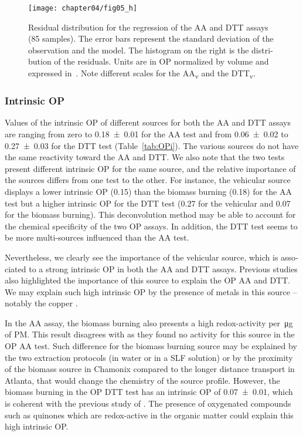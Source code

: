 \begin{otherlanguage}{english}
\begin{figure}[ht]
    \centering
    \texttt{[image: chapter04/fig05\_h]}
    \caption{Residual distribution for the regression of the AA and DTT assays
        (85 samples). The error bars represent the standard deviation of the
        observation and the model. The histogram on the right is the
        distribution of the residuals. Units are in OP normalized by volume and
        expressed in~\si{\opv}. Note different scales for the
    AA\textsubscript{v} and the DTT\textsubscript{v}.}
    \label{fig:residual}
\end{figure}

\subsubsection{Intrinsic OP}\label{intrinsic-op}

Values of the intrinsic OP of different sources for both the AA and DTT assays are ranging
from zero to \SI{0.18(1)}{\opm} for the AA test and from \SI{0.06(2)}{\opm} to
\SI{0.27(3)}{\opm} for the DTT test (Table~\ref{tab:OPi}). The various sources do not
have the same reactivity toward the AA and DTT. We also note that the two tests present
different intrinsic OP for the same source, and the relative importance of the sources
differs from one test to the other. For instance, the vehicular source displays a lower
intrinsic OP (\SI{0.15}{\opm}) than the biomass burning (\SI{0.18}{\opm}) for the AA test
but a higher intrinsic OP for the DTT test (\SI{0.27}{\opm} for the vehicular and
\SI{0.07}{\opm} for the biomass burning).  This deconvolution method may be able to
account for the chemical specificity of the two OP assays. In addition, the DTT test seems
to be more multi-sources influenced than the AA test.

Nevertheless, we clearly see the importance of the vehicular source, which is
associated to a strong intrinsic OP in both the AA and DTT assays. Previous
studies \parencite{batesReactive2015,fangOxidative2016,vermaReactive2014} also
highlighted the importance of this source to explain the OP AA and DTT. We may
explain such high intrinsic OP by the presence of metals in this source
-- notably the copper \parencite{charrierOxidant2015}.

In the AA assay, the biomass burning also presents a high redox-activity
per~\si{\micro\g} of PM. This result disagrees with \textcite{fangOxidative2016}
as they found no activity for this source in the OP AA test. Such difference for
the biomass burning source may be explained by the two extraction protocols (in
water or in a SLF solution) or by the proximity of the biomass source in
Chamonix compared to the longer distance transport in Atlanta, that would change
the chemistry of the source profile. However, the biomass burning in the OP DTT
test has an intrinsic OP of \SI{0.07(1)}{\opv}, which is
coherent with the previous study of \textcite{fangOxidative2016}. The presence of
oxygenated compounds such as quinones which are redox-active in the organic
matter could explain this high intrinsic OP.


\end{otherlanguage}
